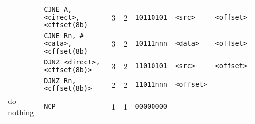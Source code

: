 \documentclass[journal]{IEEEtran}
\begin{document}
{{\begin{tabular}{|l|l|l|l|l|l|l|}
		& \texttt{CJNE A, <direct>, <offset(8b)} & 3 & 2 & \texttt{10110101} & \texttt{<src>} & \texttt{<offset>} \\
		& \texttt{CJNE Rn, \#<data>, <offset(8b)} & 3 & 2 & \texttt{10111nnn} & \texttt{<data>} & \texttt{<offset>} \\
		& \texttt{DJNZ <direct>, <offset(8b)>} & 3 & 2 & \texttt{11010101} & \texttt{<src>} & \texttt{<offset>} \\
		& \texttt{DJNZ Rn, <offset(8b)>} & 2 & 2 & \texttt{11011nnn} & \texttt{<offset>} & \\
		\hline
		do nothing
		& \texttt{NOP} & 1 & 1 & \texttt{00000000} & & \\
		\hline
	\end{tabular}
} %
} %
\end{document}
